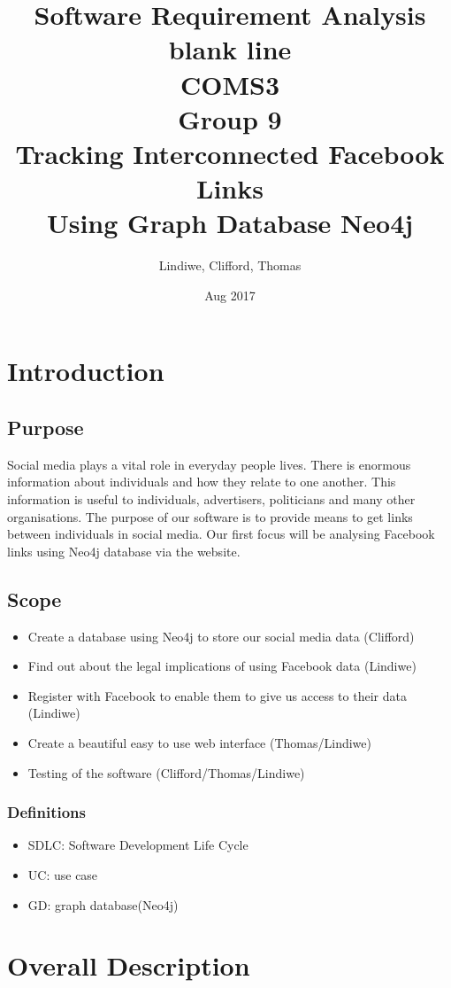 \documentclass[11pt]{article}
\title{%
Software Requirement Analysis\\\large
\color{white} blank line\\
\color{black}
COMS3\\
Group 9\\
Tracking Interconnected Facebook Links\\
Using Graph Database Neo4j}
\date{Aug 2017}
\author{Lindiwe, Clifford, Thomas}
\begin{document}
\maketitle
{}
\newpage
{}
\section{Introduction}
\subsection{Purpose}
Social media plays a vital role in everyday people lives. There is enormous information about individuals and how they relate to one another. This information is useful to individuals, advertisers, politicians and many other organisations. The purpose of our software is to provide means to get links between individuals in social media. Our first focus will be analysing Facebook links using Neo4j database via the website.

\subsection{Scope}
\begin{itemize}
\item	Create a database using Neo4j to store our social media data (Clifford)
\item Find out about the legal implications of using Facebook data (Lindiwe)
\item Register with Facebook to enable them to give us access to their data (Lindiwe)
\item Create a beautiful easy to use web interface (Thomas/Lindiwe)
\item Testing of the software (Clifford/Thomas/Lindiwe)
\end{itemize}

\subsubsection{Definitions}
\begin{itemize}
\item SDLC: Software Development Life Cycle
\item UC: use case
\item GD: graph database(Neo4j)
\end{itemize}

\section{Overall Description}
\end{document}
